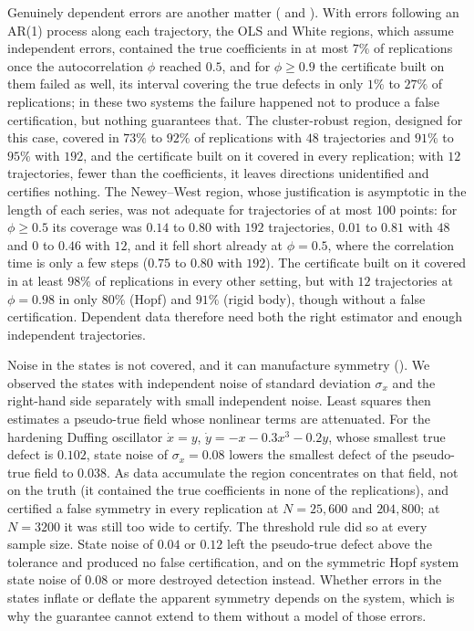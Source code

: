 Genuinely dependent errors are another matter (\SFdependence{} and
\STdependence). With errors
following an AR(1) process along each trajectory, the OLS and White regions,
which assume independent errors, contained the true coefficients in at most
$7\%$ of replications once the autocorrelation $\phi$ reached $0.5$, and for
$\phi \ge 0.9$ the certificate built on them failed as well, its interval
covering the true defects in only $1\%$ to $27\%$ of replications; in these
two systems the failure happened not to produce a false certification, but
nothing guarantees that. The cluster-robust region, designed for this case,
covered in $73\%$ to $92\%$ of replications with $48$ trajectories and $91\%$
to $95\%$ with $192$, and the certificate built on it covered in every
replication; with $12$ trajectories, fewer than the coefficients, it leaves
directions unidentified and certifies nothing. The Newey--West region, whose
justification is asymptotic in the length of each series, was not adequate
for trajectories of at most $100$ points: for $\phi \ge 0.5$ its coverage was
$0.14$ to $0.80$ with $192$ trajectories, $0.01$ to $0.81$ with $48$ and $0$
to $0.46$ with $12$, and it fell short already at $\phi = 0.5$, where the
correlation time is only a few steps ($0.75$ to $0.80$ with $192$). The
certificate built on it covered in at least $98\%$ of replications in every
other setting, but with $12$ trajectories at $\phi = 0.98$ in only $80\%$
(Hopf) and $91\%$ (rigid body), though without a false certification. Dependent
data therefore need both the right estimator and enough independent
trajectories.

Noise in the states is not covered, and it can manufacture symmetry
(\SFeiv). We observed the states with independent noise of standard deviation
$\sigma_x$ and the right-hand side separately with small independent noise.
Least squares then estimates a pseudo-true field whose nonlinear terms are
attenuated. For the hardening Duffing oscillator $\dot x = y$,
$\dot y = -x - 0.3x^3 - 0.2y$, whose smallest true defect is $0.102$, state
noise of $\sigma_x = 0.08$ lowers the smallest defect of the pseudo-true field
to $0.038$. As data accumulate the region concentrates on that field, not on
the truth (it contained the true coefficients in none of the replications), and
\symcert{} certified a false symmetry in every replication at
$N = 25{,}600$ and $204{,}800$; at $N = 3200$ it was still too wide to certify.
The threshold rule did so at every sample size. State noise of $0.04$ or $0.12$
left the pseudo-true defect above the tolerance and produced no false
certification, and on the symmetric Hopf system state noise of $0.08$ or more
destroyed detection instead. Whether errors in the states inflate or deflate the
apparent symmetry depends on the system, which is why the guarantee cannot
extend to them without a model of those errors.

